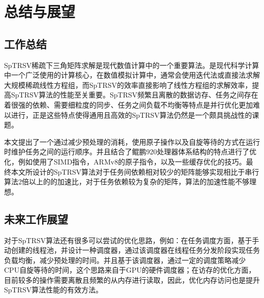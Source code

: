 \chapter{总结与展望}


\section{工作总结}

SpTRSV稀疏下三角矩阵求解是现代数值计算中的一个重要算法。是现代科学计算中一个广泛使用的计算核心，在数值模拟计算中，通常会使用迭代法或直接法求解大规模稀疏线性方程组，而SpTRSV的效率直接影响了线性方程组的求解效率，提高SpTRSV算法的性能至关重要。SpTRSV频繁且离散的数据访存、任务之间存在着很强的依赖、需要细粒度的同步、任务之间负载不均衡等特点是并行优化更加难以进行，正是这些特点使得通用且高效的SpTRSV算法仍然是一个颇具挑战性的课题。

本文提出了一个通过减少预处理的消耗，使用原子操作以及自旋等待的方式在运行时维护任务之间的运行顺序。并且结合了鲲鹏920处理器体系结构的特点进行了优化，例如使用了SIMD指令，ARMv8的原子指令，以及一些缓存优化的技巧。最终本文所设计的SpTRSV算法对于任务间依赖相对较少的矩阵能够实现相比于串行算法2倍以上的的加速比，对于任务依赖较为复杂的矩阵，算法的加速性能不够理想。


\section{未来工作展望}

对于SpTRSV算法还有很多可以尝试的优化思路，例如：在任务调度方面，基于手动创建的线程池，并设计一种调度器，通过该调度器在线程任务分发阶段实现任务负载均衡，减少预处理的时间。并且基于该调度器，通过一定的调度策略减少CPU自旋等待的时间，这个思路来自于GPU的硬件调度器；在访存的优化方面，目前较多的操作需要离散且频繁的从内存进行读取，因此，优化内存访问也是提升SpTRSV算法性能的有效方法。

\endinput